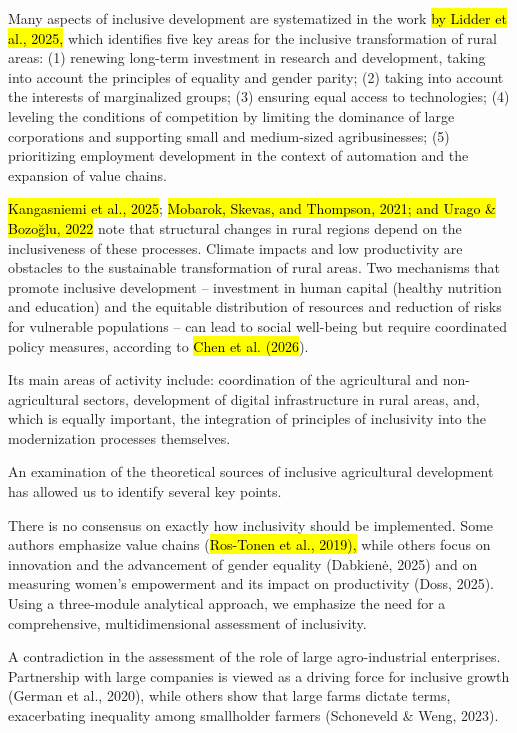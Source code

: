 \documentclass[
]{article}
\begin{document}
Many aspects of inclusive development are systematized in the work
\hl{by Lidder et al., 2025,} which identifies five key areas for the
inclusive transformation of rural areas: (1) renewing long-term
investment in research and development, taking into account the
principles of equality and gender parity; (2) taking into account the
interests of marginalized groups; (3) ensuring equal access to
technologies; (4) leveling the conditions of competition by limiting the
dominance of large corporations and supporting small and medium-sized
agribusinesses; (5) prioritizing employment development in the context
of automation and the expansion of value chains.

\hl{Kangasniemi et al., 2025}; \hl{Mobarok, Skevas, and Thompson, 2021;
and Urago \& Bozoğlu, 2022} note that structural changes in rural
regions depend on the inclusiveness of these processes. Climate impacts
and low productivity are obstacles to the sustainable transformation of
rural areas. Two mechanisms that promote inclusive development --
investment in human capital (healthy nutrition and education) and the
equitable distribution of resources and reduction of risks for
vulnerable populations -- can lead to social well-being but require
coordinated policy measures, according to \hl{Chen et al. (2026}).

Its main areas of activity include: coordination of the agricultural and
non-agricultural sectors, development of digital infrastructure in rural
areas, and, which is equally important, the integration of principles of
inclusivity into the modernization processes themselves.

An examination of the theoretical sources of inclusive agricultural
development has allowed us to identify several key points.

There is no consensus on exactly how inclusivity should be implemented.
Some authors emphasize value chains (\hl{Ros-Tonen et al., 2019),} while
others focus on innovation and the advancement of gender equality
(Dabkienė, 2025) and on measuring women's empowerment and its impact on
productivity (Doss, 2025). Using a three-module analytical approach, we
emphasize the need for a comprehensive, multidimensional assessment of
inclusivity.

A contradiction in the assessment of the role of large agro-industrial
enterprises. Partnership with large companies is viewed as a driving
force for inclusive growth (German et al., 2020), while others show that
large farms dictate terms, exacerbating inequality among smallholder
farmers (Schoneveld \& Weng, 2023).
\end{document}
